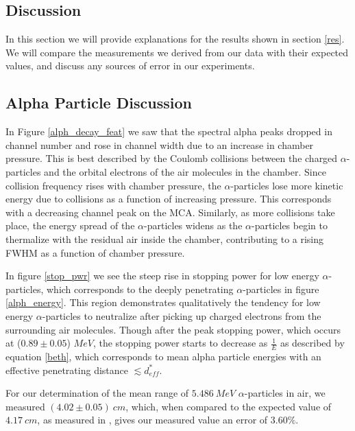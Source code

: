 \documentclass[10pt]{article}
\begin{document}
\begin{multicols}{2}


\section{Discussion} \label{dis}
In this section we will provide explanations for the results shown in section \ref{res}.  We will compare the measurements we derived from our data with their expected values, and discuss any sources of error in our experiments.

\subsection{Alpha Particle Discussion} \label{dis_alpha}
In Figure \ref{alph_decay_feat} we saw that the spectral alpha peaks dropped in channel number and rose in channel width due to an increase in chamber pressure.  This is best described by the Coulomb collisions between the charged $\alpha$-particles and the orbital electrons of the air molecules in the chamber.  Since collision frequency rises with chamber pressure, the $\alpha$-particles lose more kinetic energy due to collisions as a function of increasing pressure.  This corresponds with a decreasing channel peak on the MCA.  Similarly, as more collisions take place, the energy spread of the $\alpha$-particles widens as the $\alpha$-particles begin to thermalize with the residual air inside the chamber, contributing to a rising FWHM as a function of chamber pressure. \par                 

In figure \ref{stop_pwr} we see the steep rise in stopping power for low energy $\alpha$-particles, which corresponds to the deeply penetrating $\alpha$-particles in figure \ref{alph_energy}.  This region demonstrates qualitatively the tendency for low energy $\alpha$-particles to neutralize after picking up charged electrons from the surrounding air molecules.  Though after the peak stopping power, which occurs at ($0.89 \pm 0.05$) $MeV$, the stopping power starts to decrease as $\frac{1}{E}$ as described by equation \ref{beth}, which corresponds to mean alpha particle energies with an effective penetrating distance $\lesssim d_{eff}^{*}$. \par 

For our determination of the mean range of $5.486 \ MeV$ $\alpha$-particles in air, we measured $(4.02 \pm 0.05) \ cm$, which, when compared to the expected value of $4.17 \ cm$, as measured in \cite{bib:5}, gives our measured value an error of $3.60 \%$. \par  


\end{multicols}
\end{document}
